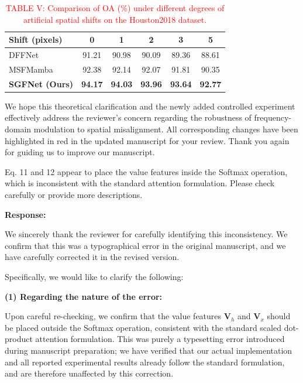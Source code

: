 \begin{table}[h]
  \centering
  \footnotesize
  \caption*{\textcolor{red}{\footnotesize TABLE V: Comparison of OA (\%) under different degrees of artificial spatial shifts on the Houston2018 dataset.}}
  \begin{tabular}{lccccc}
  \toprule
  Shift (pixels) & 0 & 1 & 2 & 3 & 5 \\
  \midrule
  DFFNet & 91.21 & 90.98 & 90.09 & 89.36 & 88.61 \\
  MSFMamba & 92.38 & 92.14 & 92.07 & 91.81 & 90.35 \\
  \rowcolor{bg} \textbf{SGFNet (Ours)} & \textbf{94.17} & \textbf{94.03} & \textbf{93.96} & \textbf{93.64} & \textbf{92.77} \\
  \bottomrule
  \end{tabular}
\end{table}

We hope this theoretical clarification and the newly added controlled experiment effectively address the reviewer's concern regarding the robustness of frequency-domain modulation to spatial misalignment. All corresponding changes have been highlighted in red in the updated manuscript for your review. Thank you again for guiding us to improve our manuscript.

\vspace{2em}

\begin{tcolorbox}[title={Reviewer \#1, Comment \#3}]
  \vspace{1em}
  
  \color{blue}
  Eq. 11 and 12 appear to place the value features inside the Softmax operation, which is inconsistent with the standard attention formulation. Please check carefully or provide more descriptions.

  \vspace{1em}
\end{tcolorbox}

\textbf{Response:}

We sincerely thank the reviewer for carefully identifying this inconsistency. We confirm that this was a typographical error in the original manuscript, and we have carefully corrected it in the revised version.

Specifically, we would like to clarify the following:

\textbf{(1) Regarding the nature of the error:}

Upon careful re-checking, we confirm that the value features $\mathbf{V}_h$ and $\mathbf{V}_x$ should be placed outside the Softmax operation, consistent with the standard scaled dot-product attention formulation. This was purely a typesetting error introduced during manuscript preparation; we have verified that our actual implementation and all reported experimental results already follow the standard formulation, and are therefore unaffected by this correction.


